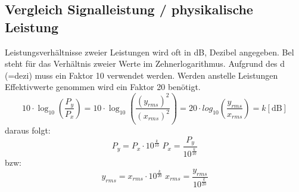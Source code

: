 \subsection{Vergleich Signalleistung / physikalische Leistung}
Leistungsverhältnisse zweier Leistungen wird oft in dB, Dezibel angegeben.
Bel steht für das Verhältnis zweier Werte im Zehnerlogarithmus.
Aufgrund des d (=dezi) muss ein Faktor 10 verwendet werden.
Werden anstelle Leistungen Effektivwerte genommen wird ein Faktor 20 benötigt.
$$10 \cdot \log_{10} (\frac{P_y}{P_x}) = 
10 \cdot \log_{10}(\frac{(y_{rms})^2}{(x_{rms})^2}) = 
20 \cdot log_{10}(\frac{y_{rms}}{x_{rms}}) = k[\textrm{dB}]$$ 
daraus folgt:
$$P_y = P_x \cdot 10^{\frac{k}{10}} \; P_x = \frac{P_y}{10^{\frac{k}{10}}}$$
bzw:
$$y_{rms} = x_{rms} \cdot 10^{\frac{k}{20}} \; x_{rms} = \frac{y_{rms}}{10^{\frac{k}{20}}}$$